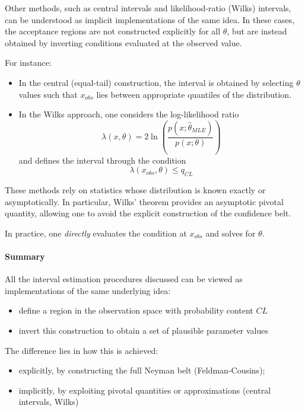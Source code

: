Other methods, such as central intervals and likelihood-ratio (Wilks) intervals, can be understood as implicit implementations of the same idea. In these cases, the acceptance regions are not constructed explicitly for all $\theta$, but are instead obtained by inverting conditions evaluated at the observed value.

For instance:
\begin{itemize}
	\item In the central (equal-tail) construction, the interval is obtained by selecting $\theta$ values such that $x_{obs}$ lies between appropriate quantiles of the distribution.
	\item In the Wilks approach, one considers the log-likelihood ratio
	\[
	\lambda(x,\theta) = 2\ln\left(\frac{p(x;\hat{\theta}_{MLE})}{p(x;\theta)}\right)
	\]
	and defines the interval through the condition
	\[
	\lambda(x_{obs},\theta) \leq q_{CL}
	\]
\end{itemize}

These methods rely on statistics whose distribution is known exactly or asymptotically. In particular, Wilks' theorem provides an asymptotic pivotal quantity, allowing one to avoid the explicit construction of the confidence belt.

In practice, one \emph{directly} evaluates the condition at $x_{obs}$ and solves for $\theta$.

\paragraph{Summary}

All the interval estimation procedures discussed can be viewed as implementations of the same underlying idea:
\begin{itemize}
	\item define a region in the observation space with probability content $CL$
	\item invert this construction to obtain a set of plausible parameter values
\end{itemize}

The difference lies in how this is achieved:
\begin{itemize}
	\item explicitly, by constructing the full Neyman belt (Feldman-Cousins);
	\item implicitly, by exploiting pivotal quantities or approximations (central intervals, Wilks)
\end{itemize}

